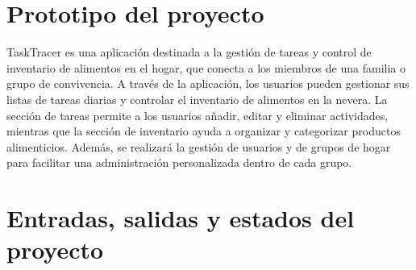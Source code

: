 \documentclass{article}
\begin{document}
\section{Prototipo del proyecto}
TaskTracer es una aplicación destinada a la gestión de tareas y control de inventario de alimentos en el hogar, que conecta a los miembros de una familia o grupo de convivencia. A través de la aplicación, los usuarios pueden gestionar sus listas de tareas diarias y controlar el inventario de alimentos en la nevera. La sección de tareas permite a los usuarios añadir, editar y eliminar actividades, mientras que la sección de inventario ayuda a organizar y categorizar productos alimenticios. Además, se realizará la gestión de usuarios y de grupos de hogar para facilitar una administración personalizada dentro de cada grupo.

\section{Entradas, salidas y estados del proyecto}
\end{document}
